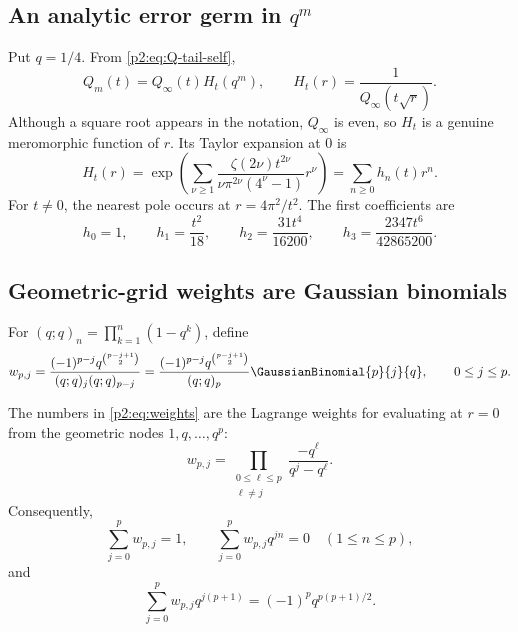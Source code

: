 \documentclass[11pt,oneside]{article}
\numberwithin{equation}{section}
\theoremstyle{definition}
\theoremstyle{remark}
\begin{document}
\subsection{An analytic error germ in $q^m$}

Put $q=1/4$.  From \eqref{p2:eq:Q-tail-self},
\begin{equation}
 Q_m(t)=Q_\infty(t)H_t(q^m),
 \qquad
 H_t(r)=\frac{1}{Q_\infty(t\sqrt r)}.
 \label{p2:eq:Hdef}
\end{equation}
Although a square root appears in the notation, $Q_\infty$ is even, so $H_t$ is a genuine
meromorphic function of $r$.  Its Taylor expansion at $0$ is
\begin{equation}
 H_t(r)=\exp\!\left(\sum_{\nu\ge1}
 \frac{\zeta(2\nu)t^{2\nu}}{\nu\pi^{2\nu}(4^\nu-1)}r^\nu\right)
 =\sum_{n\ge0}h_n(t)r^n.
 \label{p2:eq:Hseries}
\end{equation}
For $t\ne0$, the nearest pole occurs at $r=4\pi^2/t^2$.  The first coefficients are
\begin{equation}
 h_0=1,\qquad h_1=\frac{t^2}{18},\qquad
 h_2=\frac{31t^4}{16200},\qquad
 h_3=\frac{2347t^6}{42865200}.
 \label{p2:eq:hfirst}
\end{equation}

\subsection{Geometric-grid weights are Gaussian binomials}

For $(q;q)_n=\prod_{k=1}^{n}(1-q^k)$, define
\begin{equation}
 w_{p,j}=
 \frac{(-1)^{p-j}q^{\binom{p-j+1}{2}}}
 {(q;q)_j(q;q)_{p-j}}
 =\frac{(-1)^{p-j}q^{\binom{p-j+1}{2}}}{(q;q)_p}
   \GaussianBinomial{p}{j}{q},
 \qquad 0\le j\le p.
 \label{p2:eq:weights}
\end{equation}

\begin{lemma}
\label{p2:lem:weights}
The numbers in \eqref{p2:eq:weights} are the Lagrange weights for evaluating at $r=0$ from the
geometric nodes $1,q,\ldots,q^p$:
\begin{equation}
 w_{p,j}=\prod_{\substack{0\le\ell\le p\\\ell\ne j}}
 \frac{-q^\ell}{q^j-q^\ell}.
 \label{p2:eq:weights-Lagrange}
\end{equation}
Consequently,
\begin{equation}
 \sum_{j=0}^{p}w_{p,j}=1,
 \qquad
 \sum_{j=0}^{p}w_{p,j}q^{jn}=0\quad(1\le n\le p),
 \label{p2:eq:moment-cancel}
\end{equation}
and
\begin{equation}
 \sum_{j=0}^{p}w_{p,j}q^{j(p+1)}
 =(-1)^pq^{p(p+1)/2}.
 \label{p2:eq:first-uncancelled}
\end{equation}
\end{lemma}
\end{document}
